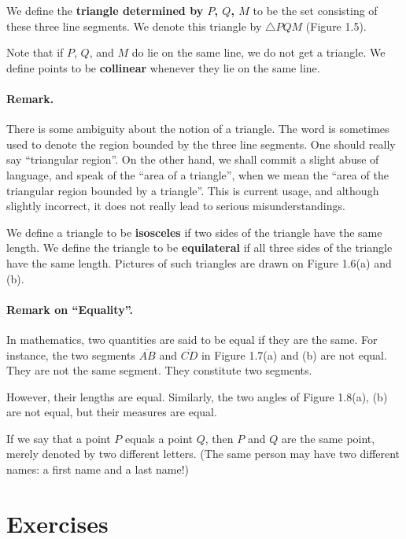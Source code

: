 \documentclass[12pt]{book} %
\begin{document}
We define the \textbf{triangle determined by $P$, $Q$, $M$} to be the set consisting of these three line segments. We denote this triangle by $\triangle PQM$ (Figure 1.5).


Note that if $P$, $Q$, and $M$ do lie on the same line, we do not get a triangle. We define points to be \textbf{collinear} whenever they lie on the same line.

\paragraph{Remark.}
There is some ambiguity about the notion of a triangle. The word is sometimes used to denote the region bounded by the three line segments. One should really say ``triangular region''. On the other hand, we shall commit a slight abuse of language, and speak of the ``area of a triangle'', when we mean the ``area of the triangular region bounded by a triangle''. This is current usage, and although slightly incorrect, it does not really lead to serious misunderstandings.

We define a triangle to be \textbf{isosceles} if two sides of the triangle have the same length. We define the triangle to be \textbf{equilateral} if all three sides of the triangle have the same length. Pictures of such triangles are drawn on Figure 1.6(a) and (b).


\paragraph{Remark on ``Equality''.}
In mathematics, two quantities are said to be equal if they are the same. For instance, the two segments $\overline{AB}$ and $\overline{CD}$ in Figure 1.7(a) and (b) are not equal. They are not the same segment. They constitute two segments.


However, their lengths are equal. Similarly, the two angles of Figure 1.8(a), (b) are not equal, but their measures are equal.


If we say that a point $P$ equals a point $Q$, then $P$ and $Q$ are the same point, merely denoted by two different letters. (The same person may have two different names: a first name and a last name!)

\section*{Exercises}
\end{document}
